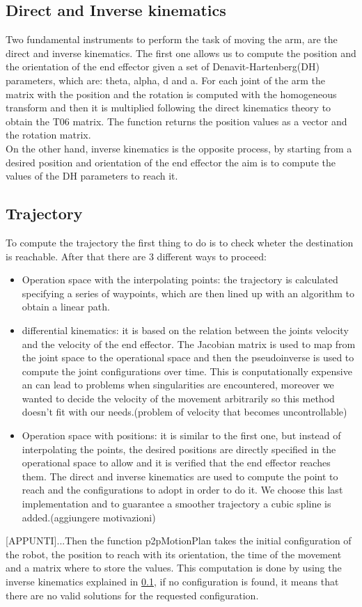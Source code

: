 \documentclass[12pt,a4paper]{article}
\begin{document}
\subsection{Direct and Inverse kinematics}\label{subsec:kinematics}
Two fundamental instruments to perform the task of moving the arm, are the direct and inverse kinematics. The first one allows us to compute the position and the orientation of the end effector given a set of Denavit-Hartenberg(DH) parameters, which are: theta, alpha, d and a. For each joint of the arm the matrix with the position and the rotation is computed with the homogeneous transform and then it is multiplied following the direct kinematics theory to obtain the T06 matrix. The function returns the position values as a vector and the rotation matrix.\\
On the other hand, inverse kinematics is the opposite process, by starting from a desired position and orientation of the end effector the aim is to compute the values of the DH parameters to reach it.

\subsection{Trajectory}\label{subsec:trajectory}
To compute the trajectory the first thing to do is to check wheter the destination is reachable. After that there are 3 different ways to proceed:
\begin{itemize}
    \item Operation space with the interpolating points: the trajectory is calculated specifying a series of waypoints, which are then lined up with an algorithm to obtain a linear path.
    \item differential kinematics: it is based on the relation between the joints velocity and the velocity of the end effector. The Jacobian matrix is used to map from the joint space to the operational space and then the pseudoinverse is used to compute the joint configurations over time. This is conputationally expensive an can lead to problems when singularities are encountered, moreover we wanted to decide the velocity of the movement arbitrarily so this method doesn't fit with our needs.(problem of velocity that becomes uncontrollable)
    \item Operation space with positions: it is similar to the first one, but instead of interpolating the points, the desired positions are directly specified in the operational space to allow and it is verified that the end effector reaches them. The direct and inverse kinematics are used to compute the point to reach and the configurations to adopt in order to do it. We choose this last implementation and to guarantee a smoother trajectory a cubic spline is added.(aggiungere motivazioni)

\end{itemize}
[APPUNTI]...Then the function p2pMotionPlan takes the initial configuration of the robot, the position to reach with its orientation, the time of the movement and a matrix where to store the values. This computation is done by using the inverse kinematics explained in \ref{subsec:kinematics}, if no configuration is found, it means that there are no valid solutions for the requested configuration.
\end{document}

